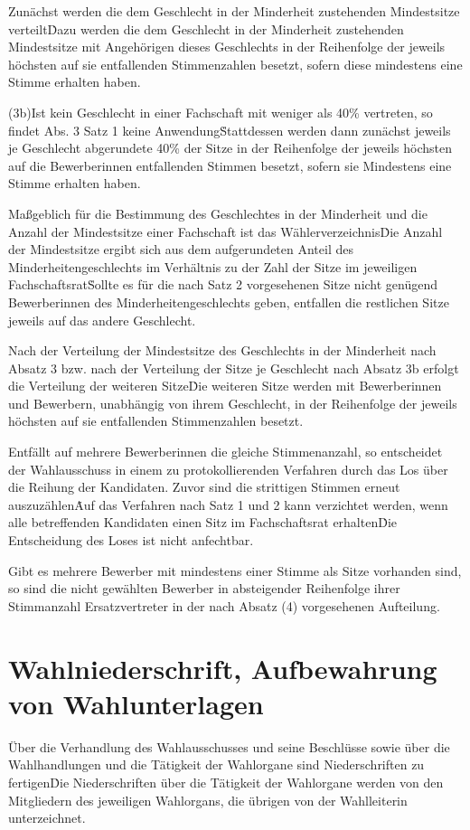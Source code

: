 \begin{multicols}{2}
\Abs \Satz Zunächst werden die dem Geschlecht in der Minderheit zustehenden Mindestsitze verteilt\. Dazu werden die dem Geschlecht in der Minderheit zustehenden Mindestsitze mit Angehörigen dieses Geschlechts in der Reihenfolge der jeweils höchsten auf sie entfallenden Stimmenzahlen besetzt, sofern diese mindestens eine Stimme erhalten haben.

\setcounter{sentence}{0} %
(3b)\Satz Ist kein Geschlecht in einer Fachschaft mit weniger als 40\% vertreten, so findet Abs. 3 Satz 1 keine Anwendung\. Stattdessen werden dann zunächst jeweils je Geschlecht abgerundete 40\% der Sitze in der Reihenfolge der jeweils höchsten auf die Bewerberinnen entfallenden Stimmen besetzt, sofern sie Mindestens eine Stimme erhalten haben.

\Abs \Satz Maßgeblich für die Bestimmung des Geschlechtes in der Minderheit und die Anzahl der Mindestsitze einer Fachschaft ist das Wählerverzeichnis\. Die Anzahl der Mindestsitze ergibt sich aus dem aufgerundeten Anteil des Minderheitengeschlechts im Verhältnis zu der Zahl der Sitze im jeweiligen Fachschaftsrat\. Sollte es für die nach Satz 2 vorgesehenen Sitze nicht genügend Bewerberinnen des Minderheitengeschlechts geben, entfallen die restlichen Sitze jeweils auf das andere Geschlecht.

\Abs \Satz Nach der Verteilung der Mindestsitze des Geschlechts in der Minderheit nach Absatz 3 bzw. nach der Verteilung der Sitze je Geschlecht nach Absatz 3b erfolgt die Verteilung der weiteren Sitze\. Die weiteren Sitze werden mit Bewerberinnen und Bewerbern, unabhängig von ihrem Geschlecht, in der Reihenfolge der jeweils höchsten auf sie entfallenden Stimmenzahlen besetzt.

\Abs \Satz Entfällt auf mehrere Bewerberinnen die gleiche Stimmenanzahl, so entscheidet der Wahlausschuss in einem zu protokollierenden Verfahren durch das Los über die Reihung der Kandidaten. Zuvor sind die strittigen Stimmen erneut auszuzählen\. Auf das Verfahren nach Satz 1 und 2 kann verzichtet werden, wenn alle betreffenden Kandidaten einen Sitz im Fachschaftsrat erhalten\. Die Entscheidung des Loses ist nicht anfechtbar.

\Abs \Satz Gibt es mehrere Bewerber mit mindestens einer Stimme als Sitze vorhanden sind, so sind die nicht gewählten Bewerber in absteigender Reihenfolge ihrer Stimmanzahl Ersatzvertreter in der nach Absatz (4) vorgesehenen Aufteilung.

\section {Wahlniederschrift, Aufbewahrung von Wahlunterlagen}
\Abs \Satz Über die Verhandlung des Wahlausschusses und seine Beschlüsse sowie über die Wahlhandlungen und die Tätigkeit der Wahlorgane sind Niederschriften zu fertigen\. Die Niederschriften über die Tätigkeit der Wahlorgane werden von den Mitgliedern des jeweiligen Wahlorgans, die übrigen von der Wahlleiterin unterzeichnet.


\end{multicols}
